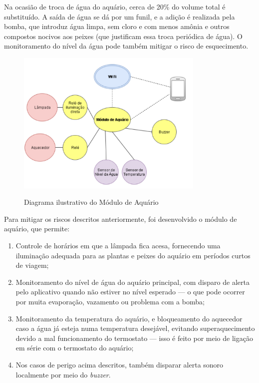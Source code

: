Na ocasião de troca de água do aquário, cerca de 20\% do volume total é substituído. A saída de água se dá por um funil, e a adição é realizada pela bomba, que introduz água limpa, sem cloro e com menos amônia e outros compostos nocivos aos peixes (que justificam essa troca periódica de água). O monitoramento do nível da água pode também mitigar o risco de esquecimento.

\begin{figure}[H]
	\centering
	\caption{Diagrama ilustrativo do Módulo de Aquário}
	\includegraphics[width=0.8\textwidth]{diagramaAquario}
	\label{fig:diagramaAquario}
\end{figure}

Para mitigar os riscos descritos anteriormente, foi desenvolvido o módulo de aquário, que permite:

\begin{enumerate}
	\item Controle de horários em que a lâmpada fica acesa, fornecendo uma iluminação adequada para as plantas e peixes do aquário em períodos curtos de viagem;
	\item Monitoramento do nível de água do aquário principal, com disparo de alerta pelo aplicativo quando não estiver no nível esperado --- o que pode ocorrer por muita evaporação, vazamento ou problema com a bomba;
	\item Monitoramento da temperatura do aquário, e bloqueamento do aquecedor caso a água já esteja numa temperatura desejável, evitando superaquecimento devido a mal funcionamento do termostato --- isso é feito por meio de ligação em série com o termostato do aquário;
	\item Nos casos de perigo acima descritos, também disparar alerta sonoro localmente por meio do \emph{buzzer}.

\end{enumerate}

